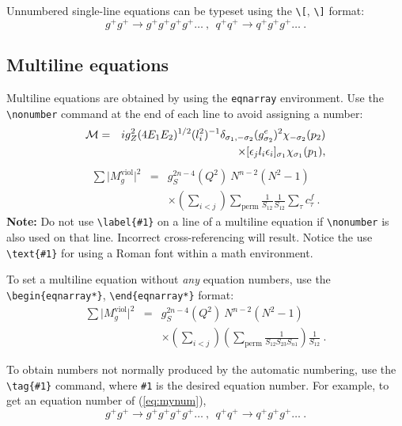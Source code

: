 \documentclass[%
reprint,
amsmath,amssymb,
aps,
]{revtex4-2}
\begin{document}
	Unnumbered single-line equations can be typeset
	using the \verb+\[+, \verb+\]+ format:
	\[g^+g^+ \rightarrow g^+g^+g^+g^+ \dots ~,~~q^+q^+\rightarrow
	q^+g^+g^+ \dots ~. \]
	
	
	\subsection{Multiline equations}
	
	Multiline equations are obtained by using the \verb+eqnarray+
	environment.  Use the \verb+\nonumber+ command at the end of each line
	to avoid assigning a number:
	\begin{eqnarray}
		{\cal M}=&&ig_Z^2(4E_1E_2)^{1/2}(l_i^2)^{-1}
		\delta_{\sigma_1,-\sigma_2}
		(g_{\sigma_2}^e)^2\chi_{-\sigma_2}(p_2)\nonumber\\
		&&\times
		[\epsilon_jl_i\epsilon_i]_{\sigma_1}\chi_{\sigma_1}(p_1),
	\end{eqnarray}
	\begin{eqnarray}
		\sum \vert M^{\text{viol}}_g \vert ^2&=&g^{2n-4}_S(Q^2)~N^{n-2}
		(N^2-1)\nonumber \\
		& &\times \left( \sum_{i<j}\right)
		\sum_{\text{perm}}
		\frac{1}{S_{12}}
		\frac{1}{S_{12}}
		\sum_\tau c^f_\tau~.
	\end{eqnarray}
	\textbf{Note:} Do not use \verb+\label{#1}+ on a line of a multiline
	equation if \verb+\nonumber+ is also used on that line. Incorrect
	cross-referencing will result. Notice the use \verb+\text{#1}+ for
	using a Roman font within a math environment.
	
	To set a multiline equation without \emph{any} equation
	numbers, use the \verb+\begin{eqnarray*}+,
		\verb+\end{eqnarray*}+ format:
	\begin{eqnarray*}
		\sum \vert M^{\text{viol}}_g \vert ^2&=&g^{2n-4}_S(Q^2)~N^{n-2}
		(N^2-1)\\
		& &\times \left( \sum_{i<j}\right)
		\left(
		\sum_{\text{perm}}\frac{1}{S_{12}S_{23}S_{n1}}
		\right)
		\frac{1}{S_{12}}~.
	\end{eqnarray*}
	
	To obtain numbers not normally produced by the automatic numbering,
	use the \verb+\tag{#1}+ command, where \verb+#1+ is the desired
	equation number. For example, to get an equation number of
	(\ref{eq:mynum}),
	\begin{equation}
		g^+g^+ \rightarrow g^+g^+g^+g^+ \dots ~,~~q^+q^+\rightarrow
		q^+g^+g^+ \dots ~. \tag{2.6$'$}\label{eq:mynum}
	\end{equation}
	
\end{document}
